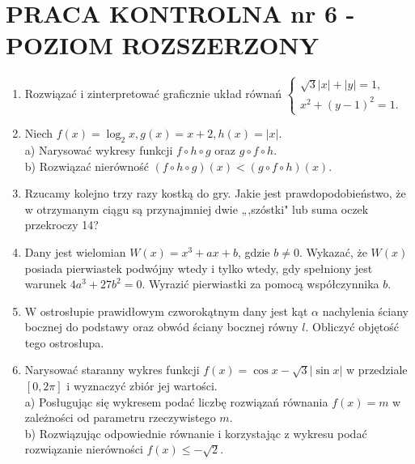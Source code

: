 \documentclass[10pt]{article}
\begin{document}
\section*{PRACA KONTROLNA nr 6 - POZIOM ROZSZERZONY}
\begin{enumerate}
  \item Rozwiązać i zinterpretować graficznie układ równań $\left\{\begin{array}{l}\sqrt{3}|x|+|y|=1, \\ x^{2}+(y-1)^{2}=1 .\end{array}\right.$
  \item Niech $f(x)=\log _{2} x, g(x)=x+2, h(x)=|x|$.\\
a) Narysować wykresy funkcji $f \circ h \circ g$ oraz $g \circ f \circ h$.\\
b) Rozwiązać nierówność $(f \circ h \circ g)(x)<(g \circ f \circ h)(x)$.
  \item Rzucamy kolejno trzy razy kostką do gry. Jakie jest prawdopodobieństwo, że w otrzymanym ciągu są przynajmniej dwie „,szóstki" lub suma oczek przekroczy 14?
  \item Dany jest wielomian $W(x)=x^{3}+a x+b$, gdzie $b \neq 0$. Wykazać, że $W(x)$ posiada pierwiastek podwójny wtedy i tylko wtedy, gdy spełniony jest warunek $4 a^{3}+27 b^{2}=0$. Wyrazić pierwiastki za pomocą współczynnika $b$.
  \item W ostrosłupie prawidłowym czworokątnym dany jest kąt $\alpha$ nachylenia ściany bocznej do podstawy oraz obwód ściany bocznej równy $l$. Obliczyć objętość tego ostrosłupa.
  \item Narysować staranny wykres funkcji $f(x)=\cos x-\sqrt{3}|\sin x|$ w przedziale $[0,2 \pi]$ i wyznaczyć zbiór jej wartości.\\
a) Posługując się wykresem podać liczbę rozwiązań równania $f(x)=m$ w zależności od parametru rzeczywistego $m$.\\
b) Rozwiązując odpowiednie równanie i korzystając z wykresu podać rozwiązanie nierówności $f(x) \leqslant-\sqrt{2}$.
\end{enumerate}
\end{document}
